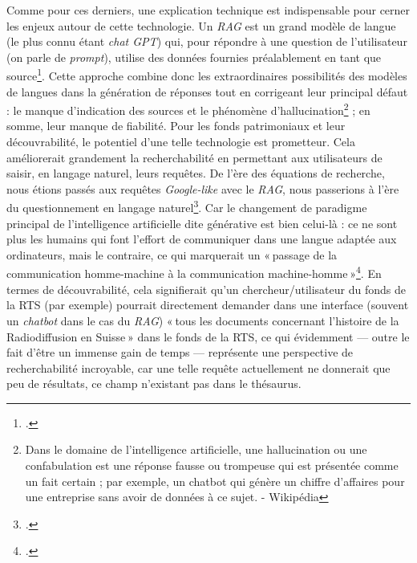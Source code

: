Comme pour ces derniers, une explication technique est indispensable pour cerner les enjeux autour de cette technologie. Un \textit{RAG} est un grand modèle de langue (le plus connu étant \textit{chat GPT}) qui, pour répondre à une question de l’utilisateur (on parle de \textit{prompt}), utilise des données fournies préalablement en tant que source\footcite{pouyllau_quels_2024}. Cette approche combine donc les extraordinaires possibilités des modèles de langues dans la génération de réponses tout en corrigeant leur principal défaut : le manque d’indication des sources et le phénomène d’hallucination\footnote{Dans le domaine de l'intelligence artificielle, une hallucination ou une confabulation est une réponse fausse ou trompeuse qui est présentée comme un fait certain ; par exemple, un chatbot qui génère un chiffre d'affaires pour une entreprise sans avoir de données à ce sujet. - Wikipédia} ; en somme, leur manque de fiabilité. Pour les fonds patrimoniaux et leur découvrabilité, le potentiel d’une telle technologie est prometteur. Cela améliorerait grandement la recherchabilité en permettant aux utilisateurs de saisir, en langage naturel, leurs requêtes. De l’ère des équations de recherche, nous étions passés aux requêtes \textit{Google-like} avec le \textit{RAG}, nous passerions à l’ère du questionnement en langage naturel\footcite{bermes_futur_2024}. Car le changement de paradigme principal de l’intelligence artificielle dite générative est bien celui-là : ce ne sont plus les humains qui font l’effort de communiquer dans une langue adaptée aux ordinateurs, mais le contraire, ce qui marquerait un « passage de la communication homme-machine à la communication machine-homme »\footcite[p. 7]{pillaud_et_2024}. En termes de découvrabilité, cela signifierait qu’un chercheur/utilisateur du fonds de la RTS (par exemple) pourrait directement demander dans une interface (souvent un \textit{chatbot} dans le cas du \textit{RAG}) « tous les documents concernant l’histoire de la Radiodiffusion en Suisse » dans le fonds de la RTS, ce qui évidemment — outre le fait d’être un immense gain de temps — représente une perspective de recherchabilité incroyable, car une telle requête actuellement ne donnerait que peu de résultats, ce champ n’existant pas dans le thésaurus.


